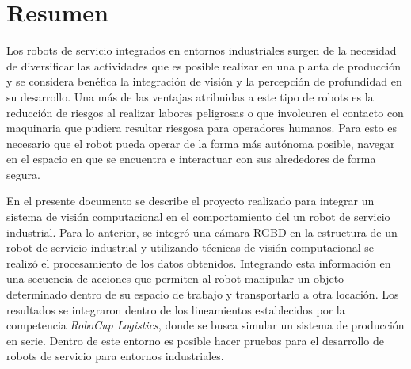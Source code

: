\chapter*{Resumen}

Los robots de servicio integrados en entornos industriales surgen de la necesidad de diversificar las actividades que es posible realizar en una planta de producción y se considera benéfica la integración de visión y la percepción de profundidad en su desarrollo. Una más de las ventajas atribuidas a este tipo de robots es la reducción de riesgos al realizar labores peligrosas o que involcuren el contacto con maquinaria que pudiera resultar riesgosa para operadores humanos. Para esto es necesario que el robot pueda operar de la forma más autónoma posible, navegar en el espacio en que se encuentra e interactuar con sus alrededores de forma segura. 

En el presente documento se describe el proyecto realizado para integrar un sistema de visión computacional en el comportamiento del un robot de servicio industrial.
Para lo anterior, se integró una cámara RGBD en la estructura de un robot de servicio industrial y utilizando técnicas de visión computacional se realizó el procesamiento de los datos obtenidos. Integrando esta información en una secuencia de acciones que permiten al robot manipular un objeto determinado dentro de su espacio de trabajo y transportarlo a otra locación.
Los resultados se integraron dentro de los lineamientos establecidos por la competencia \textit{RoboCup Logistics}, donde se busca simular un sistema de producción en serie. Dentro de este entorno es posible hacer pruebas para el desarrollo de robots de servicio para entornos industriales.